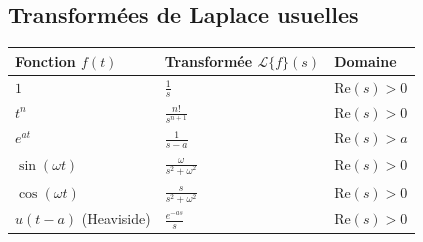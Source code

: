 \documentclass[12pt]{article}
\begin{document}
\vspace{1em}

\subsection*{Transformées de Laplace usuelles}

\renewcommand{\arraystretch}{3}
\begin{center}
\begin{tabular}{|>{\centering\arraybackslash}m{3.5cm}|>{\centering\arraybackslash}m{5cm}|>{\centering\arraybackslash}m{3cm}|}
\hline
\textbf{Fonction} $f(t)$ & \textbf{Transformée} $\mathcal{L}\{f\}(s)$ & \textbf{Domaine} \\
\hline\hline
$1$ & $\displaystyle \frac{1}{s}$ & $\text{Re}(s) > 0$ \\
\hline
$t^n$ & $\displaystyle \frac{n!}{s^{n+1}}$ & $\text{Re}(s) > 0$ \\
\hline
$e^{at}$ & $\displaystyle \frac{1}{s-a}$ & $\text{Re}(s) > a$ \\
\hline
$\sin(\omega t)$ & $\displaystyle \frac{\omega}{s^2 + \omega^2}$ & $\text{Re}(s) > 0$ \\
\hline
$\cos(\omega t)$ & $\displaystyle \frac{s}{s^2 + \omega^2}$ & $\text{Re}(s) > 0$ \\
\hline
$u(t-a)$ (Heaviside) & $\displaystyle \frac{e^{-as}}{s}$ & $\text{Re}(s) > 0$ \\
\hline
\end{tabular}
\end{center}

\vspace{1em}
\end{document}

